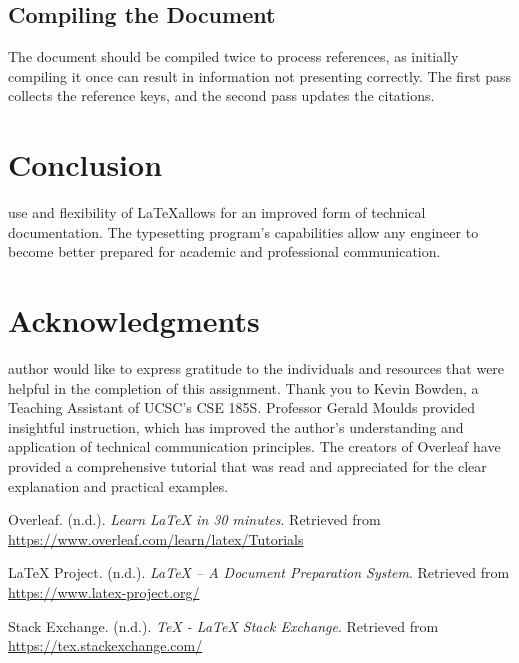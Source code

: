\documentclass[12pt,journal,compsoc]{IEEEtran}
\begin{document}
\subsection{Compiling the Document}
The document should be compiled twice to process references, as initially compiling it once can result in information not presenting correctly. The first pass collects the reference keys, and the second pass updates the citations.

\section{Conclusion}
 use and flexibility of \LaTeX allows for an improved form of technical documentation. The typesetting program's capabilities allow any engineer to become better prepared for academic and professional communication. 

\section*{Acknowledgments}
 author would like to express gratitude to the individuals and resources that were helpful in the completion of this assignment. Thank you to Kevin Bowden, a Teaching Assistant of UCSC's CSE 185S. Professor Gerald Moulds provided insightful instruction, which has improved the author's understanding and application of technical communication principles. The creators of Overleaf have provided a comprehensive tutorial that was read and appreciated for the clear explanation and practical examples.

\begin{thebibliography}{3}
Overleaf. (n.d.). \textit{Learn LaTeX in 30 minutes}. Retrieved from \url{https://www.overleaf.com/learn/latex/Tutorials}

LaTeX Project. (n.d.). \textit{LaTeX – A Document Preparation System}. Retrieved from \url{https://www.latex-project.org/}

Stack Exchange. (n.d.). \textit{TeX - LaTeX Stack Exchange}. Retrieved from \url{https://tex.stackexchange.com/}

\end{thebibliography}
\end{document}
